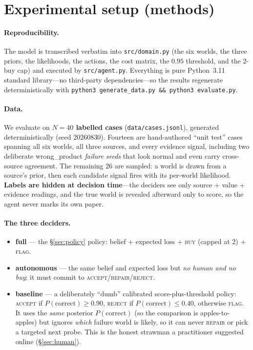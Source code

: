 \documentclass[11pt]{article}
\newcommand{\pcorrect}{P(\text{correct})}
\begin{document}
\section{Experimental setup (methods)}
\label{sec:methods}

\paragraph{Reproducibility.} The model is transcribed verbatim into
\texttt{src/domain.py} (the six worlds, the three priors, the likelihoods, the actions,
the cost matrix, the $0.95$ threshold, and the 2-buy cap) and executed by
\texttt{src/agent.py}. Everything is pure Python~3.11 standard library---no third-party
dependencies---so the results regenerate deterministically with
\texttt{python3 generate\_data.py \&\& python3 evaluate.py}.

\paragraph{Data.} We evaluate on \textbf{$N=40$ labelled cases}
(\texttt{data/cases.jsonl}), generated deterministically (seed 20260830). Fourteen are
hand-authored ``unit test'' cases spanning all six worlds, all three sources, and every
evidence signal, including two deliberate \textsf{wrong\_product} \emph{failure seeds}
that look normal and even carry cross-source agreement. The remaining 26 are sampled:
a world is drawn from a source's prior, then each candidate signal fires with its
per-world likelihood. \textbf{Labels are hidden at decision time}---the deciders see
only source $+$ value $+$ evidence readings, and the true world is revealed afterward
only to score, so the agent never marks its own paper.

\paragraph{The three deciders.}
\begin{itemize}[nosep]
  \item \textbf{full} --- the \S\ref{sec:policy} policy: belief $+$ expected loss $+$
        \textsc{buy} (capped at 2) $+$ \textsc{flag}.
  \item \textbf{autonomous} --- the same belief and expected loss but \emph{no human and
        no buy}; it must commit to \textsc{accept}/\textsc{repair}/\textsc{reject}.
  \item \textbf{baseline} --- a deliberately ``dumb'' calibrated score-plus-threshold
        policy: \textsc{accept} if $\pcorrect\ge 0.90$, \textsc{reject} if
        $\pcorrect\le 0.40$, otherwise \textsc{flag}. It uses the \emph{same} posterior
        $\pcorrect$ (so the comparison is apples-to-apples) but ignores \emph{which}
        failure world is likely, so it can never \textsc{repair} or pick a targeted next
        probe. This is the honest strawman a practitioner suggested online (\S\ref{sec:human}).
\end{itemize}
\end{document}
